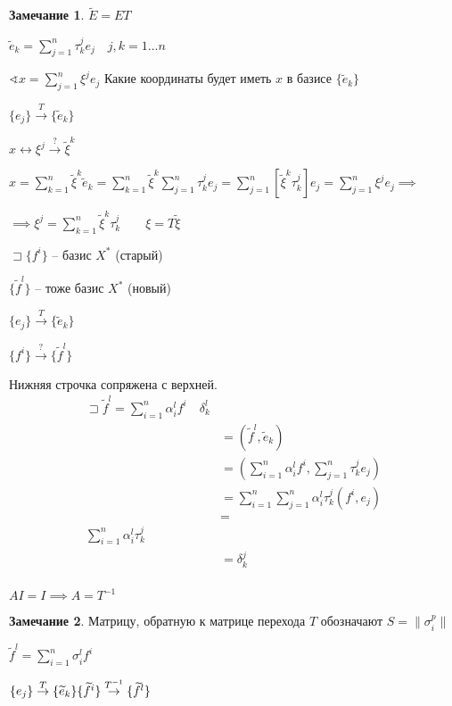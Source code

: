 \documentclass{book}
\newcommand{\tl}[1]{\widetilde{#1}}
\newcommand{\ov}[2]{\overset{#1}{#2}}
\theoremstyle{definition}
\newtheorem*{note}{Замечание}
\begin{document}
\begin{note}    
 $\tl E = ET$

 $\tl e_k = \sum_{j=1}^{n} \tau^j_ke_j\quad j, k = 1\ldots n$
\end{note}

$\sphericalangle x = \sum_{j=1}^{n} \xi^je_j$ Какие координаты будет иметь $x$ в базисе  $\{\tl e_k\}$

$\{e_j\}\ov{T}{\rightarrow} \{\tl e_k\}$

$x\leftrightarrow \xi^j \ov{?}{\rightarrow} \tl \xi^k$

 $x = \sum_{k=1}^{n} \tl \xi^k\tl e_k = \sum_{k=1}^{n} \tl \xi^k \sum_{j=1}^{n} \tau_k^je_j = \sum_{j=1}^{n} \left[ \tl \xi^k\tau_k^j \right] e_j = \sum_{j=1}^{n} \xi^je_j \implies $ 

 $\implies \xi^j = \sum_{k=1}^{n} \tl\xi^k\tau_k^j\qquad \xi = T\tl \xi$ 

 $\sqsupset \{f^i\}$ -- базис $X^*$ (старый)

 $\{\tl f^l\}$ -- тоже базис  $X^*$ (новый)

 $\{e_j\} \ov{T}{\rightarrow}\{\tl e_k\}$

    $\{f^i\} \ov{?}{\rightarrow} \{\tl f^l\}$

    Нижняя строчка сопряжена с верхней.
    \begin{align}
    \sqsupset \tl f^l = \sum_{i=1}^{n} \alpha_i^lf^i\quad \delta_k^l \\&= \left( \tl f^l, \tl e_k \right)  \\&= \left( \sum_{i=1}^{n} \alpha_i^lf^i, \sum_{j=1}^{n} \tau_k^je_j \right) \\&= \sum_{i=1}^{n} \sum_{j=1}^{n} \alpha_i^l\tau_k^j\left( f^i, e_j \right)\\  &=  \\
    \sum_{i=1}^{n} \alpha_i^l\tau_k^j \\&= \delta_k^j\\
\end{align}

$AI = I\implies A = T^{-1}$

\begin{note}
    Матрицу, обратную к матрице перехода $T$ обозначают  $S = \|\sigma_i^p\|$
\end{note}

$\tl f^l = \sum_{i=1}^{n} \sigma_i^lf^i$ 

$\{e_j\} \ov T {\rightarrow} \{\tl e_k\}\\ \{\tl f^i\} \ov {T^{-1}}{\rightarrow} \{\tl f^l\}$
\end{document}

